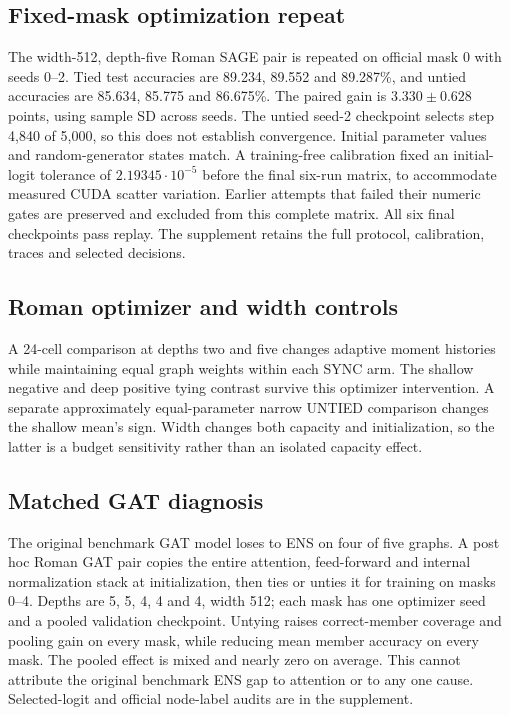 \subsection{Fixed-mask optimization repeat}\label{app:fixed-mask-v4}
The width-512, depth-five Roman SAGE pair is repeated on official mask 0
with seeds 0--2. Tied test accuracies are 89.234, 89.552 and 89.287\%,
and untied accuracies are 85.634, 85.775 and 86.675\%. The paired gain
is $3.330\pm0.628$ points, using sample SD across seeds. The untied
seed-2 checkpoint selects step 4,840 of 5,000, so this does not establish
convergence. Initial parameter values and random-generator states match.
A training-free calibration fixed an initial-logit tolerance of
$2.19345\cdot10^{-5}$ before the final six-run matrix, to accommodate
measured CUDA scatter variation. Earlier attempts that failed their
numeric gates are preserved and excluded from this complete matrix.
All six final checkpoints pass replay. The supplement retains the full
protocol, calibration, traces and selected decisions.

\subsection{Roman optimizer and width controls}\label{app:roman-optimizer}
A 24-cell comparison at depths two and five changes adaptive moment
histories while maintaining equal graph weights within each SYNC arm.
The shallow negative and deep positive tying contrast survive this
optimizer intervention. A separate approximately equal-parameter
narrow UNTIED comparison changes the shallow mean's sign. Width
changes both capacity and initialization, so the latter is a budget
sensitivity rather than an isolated capacity effect.
\label{app:roman-narrow}

\subsection{Matched GAT diagnosis}\label{app:gat-pair}
The original benchmark GAT model loses to ENS on four of five graphs. A post hoc
Roman GAT pair copies the entire attention, feed-forward and internal
normalization stack at initialization, then ties or unties it for
training on masks 0--4. Depths are 5, 5, 4, 4 and 4, width 512; each
mask has one optimizer seed and a pooled validation checkpoint.
Untying raises correct-member coverage and pooling gain on every mask,
while reducing mean member accuracy on every mask. The pooled effect
is mixed and nearly zero on average. This cannot attribute the original benchmark
ENS gap to attention or to any one cause. Selected-logit and official
node-label audits are in the supplement.


